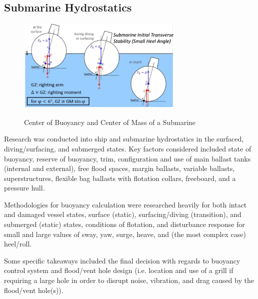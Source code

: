 \documentclass{report}
\begin{document}
\subsection{Submarine Hydrostatics}
\begin{figure}[h]
\centering
\includegraphics[width=8cm]{"Submarine Hydrostatics"}
\caption{Center of Buoyancy and Center of Mass of a Submarine}
\cite{hydrostatics}
\end{figure}
Research was conducted into ship and submarine hydrostatics in the surfaced, diving/surfacing, and submerged states.  Key factors considered included state of buoyancy, reserve of buoyancy, trim, configuration and use of main ballast tanks (internal and external), free flood spaces, margin ballasts, variable ballasts, superstructures, flexible bag ballasts with flotation collars, freeboard, and a pressure hull.\par
\indent Methodologies for buoyancy calculation were researched heavily for both intact and damaged vessel states, surface (static), surfacing/diving (transition), and submerged (static) states, conditions of flotation, and disturbance response for small and large values of sway, yaw, surge, heave, and (the most complex case) heel/roll.\par
\indent Some specific takeaways included the final decision with regards to buoyancy control system and flood/vent hole design (i.e. location and use of a grill if requiring a large hole in order to disrupt noise, vibration, and drag caused by the flood/vent hole(s)).
\end{document}
